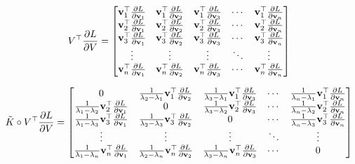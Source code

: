 	\begin{equation}
	\begin{aligned}
	V^{\top}\frac{\partial L}{\partial V} = 
	\begin{bmatrix}
	\mathbf{v}_{1}^{\top}\frac{\partial L}{\partial \mathbf{v}_{1}} &\mathbf{v}_{1}^{\top}\frac{\partial L}{\partial \mathbf{v}_{2}}  &\mathbf{v}_{1}^{\top}\frac{\partial L}{\partial \mathbf{v}_{3}}  &\cdots &\mathbf{v}_{1}^{\top}\frac{\partial L}{\partial \mathbf{v}_{n}} \\
	\mathbf{v}_{2}^{\top}\frac{\partial L}{\partial \mathbf{v}_{1}} &\mathbf{v}_{2}^{\top}\frac{\partial L}{\partial \mathbf{v}_{2}}  &\mathbf{v}_{2}^{\top}\frac{\partial L}{\partial \mathbf{v}_{3}}  &\cdots &\mathbf{v}_{2}^{\top}\frac{\partial L}{\partial \mathbf{v}_{n}} \\
	\mathbf{v}_{3}^{\top}\frac{\partial L}{\partial \mathbf{v}_{1}} &\mathbf{v}_{3}^{\top}\frac{\partial L}{\partial \mathbf{v}_{2}}  &\mathbf{v}_{3}^{\top}\frac{\partial L}{\partial \mathbf{v}_{3}}  &\cdots &\mathbf{v}_{3}^{\top}\frac{\partial L}{\partial \mathbf{v}_{n}} \\
	\vdots &\vdots &\vdots &\ddots &\vdots\\
	\mathbf{v}_{n}^{\top}\frac{\partial L}{\partial \mathbf{v}_{1}} &\mathbf{v}_{n}^{\top}\frac{\partial L}{\partial \mathbf{v}_{2}}  &\mathbf{v}_{n}^{\top}\frac{\partial L}{\partial \mathbf{v}_{3}}  &\cdots &\mathbf{v}_{n}^{\top}\frac{\partial L}{\partial \mathbf{v}_{n}} \\
	\end{bmatrix}
	\end{aligned}
	\end{equation}
	
	\begin{equation}
	\begin{aligned}
	\tilde{K}\circ V^{\top}\frac{\partial L}{\partial V} = 
	\begin{bmatrix}
	0& \frac{1}{\lambda_{2} - \lambda_{1}}\mathbf{v}_{1}^{\top}\frac{\partial L}{\partial \mathbf{v}_{2}}  
	&\frac{1}{\lambda_{3} - \lambda_{1}}\mathbf{v}_{1}^{\top}\frac{\partial L}{\partial \mathbf{v}_{3}}  
	&\cdots &\frac{1}{\lambda_{n} - \lambda_{1}}\mathbf{v}_{1}^{\top}\frac{\partial L}{\partial \mathbf{v}_{n}} \\
	\frac{1}{\lambda_{1} - \lambda_{2}}\mathbf{v}_{2}^{\top}\frac{\partial L}{\partial \mathbf{v}_{1}} &0  
	&\frac{1}{\lambda_{3} - \lambda_{2}}\mathbf{v}_{2}^{\top}\frac{\partial L}{\partial \mathbf{v}_{3}}  &\cdots 
	&\frac{1}{\lambda_{n} - \lambda_{2}}\mathbf{v}_{2}^{\top}\frac{\partial L}{\partial \mathbf{v}_{n}} \\
	\frac{1}{\lambda_{1} - \lambda_{3}}\mathbf{v}_{3}^{\top}\frac{\partial L}{\partial \mathbf{v}_{1}} 
	&\frac{1}{\lambda_{2} - \lambda_{3}}\mathbf{v}_{3}^{\top}\frac{\partial L}{\partial \mathbf{v}_{2}}  &0  &\cdots 
	&\frac{1}{\lambda_{n} - \lambda_{3}}\mathbf{v}_{3}^{\top}\frac{\partial L}{\partial \mathbf{v}_{n}} \\
	\vdots &\vdots &\vdots &\ddots &\vdots\\
	\frac{1}{\lambda_{1} - \lambda_{n}}\mathbf{v}_{n}^{\top}\frac{\partial L}{\partial \mathbf{v}_{1}} 
	&\frac{1}{\lambda_{2} - \lambda_{n}}\mathbf{v}_{n}^{\top}\frac{\partial L}{\partial \mathbf{v}_{2}} 
	 &\frac{1}{\lambda_{3} - \lambda_{n}}\mathbf{v}_{n}^{\top}\frac{\partial L}{\partial \mathbf{v}_{3}}  &\cdots &0 \\
	\end{bmatrix}
	\end{aligned}
	\end{equation}
	
